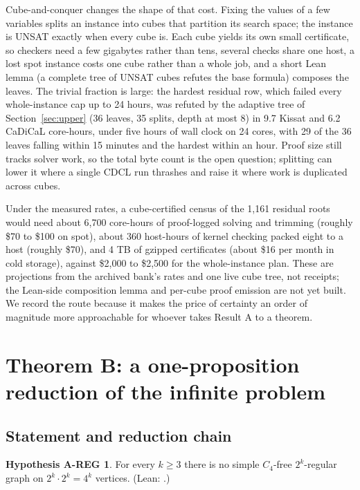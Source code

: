 \documentclass{anvil-paper}
\theoremstyle{definition}
\newtheorem*{hypAREG}{Hypothesis A-REG}
\begin{document}
Cube-and-conquer \citep{heule2011cube} changes the shape of that cost. Fixing the values of a few variables splits an instance into cubes that partition its search space; the instance is UNSAT exactly when every cube is. Each cube yields its own small certificate, so checkers need a few gigabytes rather than tens, several checks share one host, a lost spot instance costs one cube rather than a whole job, and a short Lean lemma (a complete tree of UNSAT cubes refutes the base formula) composes the leaves. The trivial fraction is large: the hardest residual row, which failed every whole-instance cap up to 24 hours, was refuted by the adaptive tree of Section~\ref{sec:upper} (36 leaves, 35 splits, depth at most 8) in 9.7 Kissat and 6.2 CaDiCaL core-hours, under five hours of wall clock on 24 cores, with 29 of the 36 leaves falling within 15 minutes and the hardest within an hour. Proof size still tracks solver work, so the total byte count is the open question; splitting can lower it where a single CDCL run thrashes and raise it where work is duplicated across cubes.

Under the measured rates, a cube-certified census of the 1,161 residual roots would need about 6,700 core-hours of proof-logged solving and trimming (roughly \$70 to \$100 on spot), about 360 host-hours of kernel checking packed eight to a host (roughly \$70), and 4 TB of gzipped certificates (about \$16 per month in cold storage), against \$2,000 to \$2,500 for the whole-instance plan. These are projections from the archived bank's rates and one live cube tree, not receipts; the Lean-side composition lemma and per-cube proof emission are not yet built. We record the route because it makes the price of certainty an order of magnitude more approachable for whoever takes Result A to a theorem.

\section{Theorem B: a one-proposition reduction of the infinite problem}\label{sec:theoremB}

\subsection{Statement and reduction chain}\label{sec:chain}

\begin{hypAREG}
For every $k\ge 3$ there is no simple $C_4$-free $2^k$-regular graph on $2^k\cdot 2^k=4^k$ vertices. (Lean: .)
\end{hypAREG}
\end{document}
